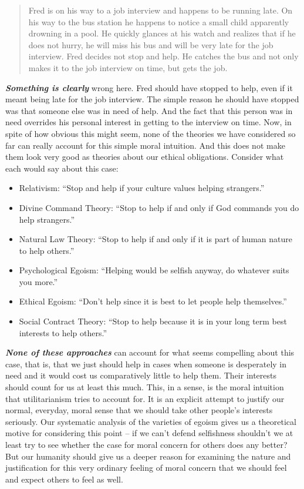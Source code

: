 \documentclass[12pt, openany]{book}
\providecommand{\tightlist}{%
  \setlength{\itemsep}{0pt}\setlength{\parskip}{0pt}}
\begin{document}
\begin{quote}
Fred is on his way to a job interview and happens to be running late. On his way to the bus station he happens to notice a small child apparently drowning in a pool. He quickly glances at his watch and realizes that if he does not hurry, he will miss his bus and will be very late for the job interview. Fred decides not stop and help. He catches the bus and not only makes it to the job interview on time, but gets the job.
\end{quote}

\textbf{\emph{Something is clearly}} wrong here. Fred should have stopped to help, even if it meant being late for the job interview. The simple reason he should have stopped was that someone else was in need of help. And the fact that this person was in need overrides his personal interest in getting to the interview on time. Now, in spite of how obvious this might seem, none of the theories we have considered so far can really account for this simple moral intuition. And this does not make them look very good as theories about our ethical obligations. Consider what each would say about this case:

\begin{itemize}
\tightlist
\item
  Relativism: ``Stop and help if your culture values helping strangers.''
\item
  Divine Command Theory: ``Stop to help if and only if God commands you do help strangers.''
\item
  Natural Law Theory: ``Stop to help if and only if it is part of human nature to help others.''
\item
  Psychological Egoism: ``Helping would be selfish anyway, do whatever suits you more.''
\item
  Ethical Egoism: ``Don't help since it is best to let people help themselves.''
\item
  Social Contract Theory: ``Stop to help because it is in your long term best interests to help others.''
\end{itemize}

\textbf{\emph{None of these approaches}} can account for what seems compelling about this case, that is, that we just should help in cases when someone is desperately in need and it would cost us comparatively little to help them. Their interests should count for us at least this much. This, in a sense, is the moral intuition that utilitarianism tries to account for. It is an explicit attempt to justify our normal, everyday, moral sense that we should take other people's interests seriously. Our systematic analysis of the varieties of egoism gives us a theoretical motive for considering this point -- if we can't defend selfishness shouldn't we at least try to see whether the case for moral concern for others does any better? But our humanity should give us a deeper reason for examining the nature and justification for this very ordinary feeling of moral concern that we should feel and expect others to feel as well.
\end{document}
